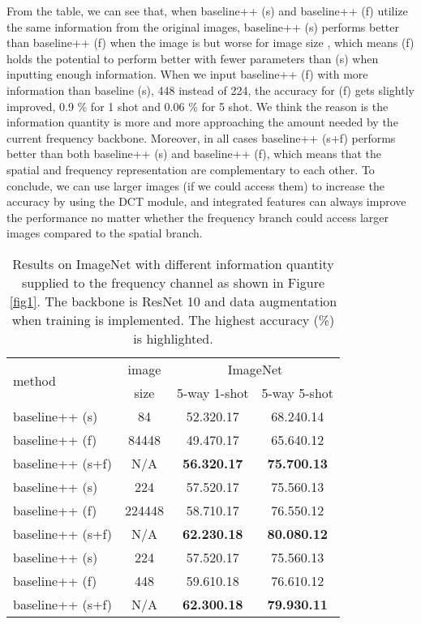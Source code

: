 \documentclass[10pt, conference, compsocconf]{IEEEtran}
\begin{document}
From the table, we can see that, when baseline++ (s) and baseline++ (f) utilize the same information from the original images, baseline++ (s) performs better than baseline++ (f) when the image is  but worse for image size , which means (f) holds the potential to perform better with fewer parameters than (s) when inputting enough information. When we input baseline++ (f) with more information than baseline (s), 448 instead of 224, the accuracy for (f) gets slightly improved, 0.9 \% for 1 shot and 0.06 \% for 5 shot. We think the reason is the information quantity is more and more approaching the amount needed by the current frequency backbone. Moreover, in all cases baseline++ (s+f) performs better than both baseline++ (s) and baseline++ (f), which means that the spatial and frequency representation are complementary to each other. To conclude, we can use larger images (if we could access them) to increase the accuracy by using the DCT module, and integrated features can always improve the performance no matter whether the frequency branch could access larger images compared to the spatial branch. 



\begin{table}[tp]
\centering
\caption{Results on ImageNet with different information quantity supplied to the frequency channel as shown in Figure \ref{fig1}. The backbone is ResNet 10 and data augmentation when training is implemented. The highest accuracy (\%) is highlighted.}
\begin{tabular}{l|c|cc}
\toprule
\multirow{2}{*}{method} & image & 
\multicolumn{2}{c}{ImageNet} \\
& size &5-way 1-shot& 5-way 5-shot\\ \hline
baseline++ (s) & 84 & 52.320.17 & 68.240.14 \\
baseline++ (f) & 84448 & 49.470.17 & 65.640.12 \\
baseline++ (s+f) & N/A & {}{\bf{56.320.17}} & {}{\bf{75.700.13}} \\\hline
baseline++ (s) & 224 & 57.520.17 & 75.560.13  \\
baseline++ (f) & 224448 & {}{58.710.17} & {}{76.550.12} \\
baseline++ (s+f) & N/A & {}{\bf{62.230.18}} & {}{\bf{80.080.12}} \\\hline
baseline++ (s) & 224 & 57.520.17 & 75.560.13  \\
baseline++ (f) & 448 & 59.610.18 & 76.610.12  \\
baseline++ (s+f) & N/A & {}{\bf{62.300.18}} & {}{\bf{79.930.11}} \\

\bottomrule
\end{tabular}
\label{table2}
\end{table}
\end{document}
